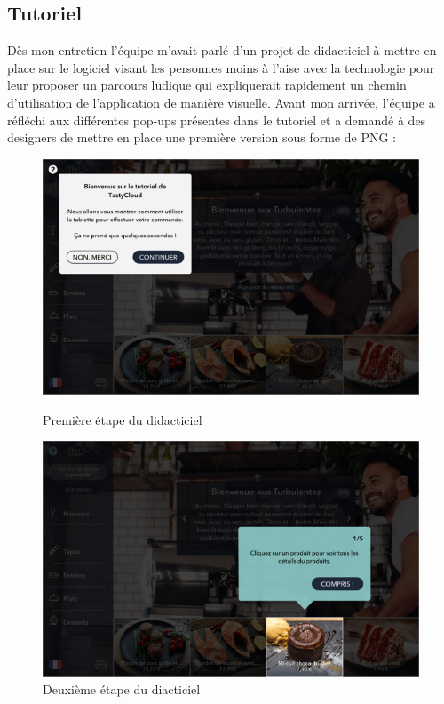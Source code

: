 \clearpage

\subsection{Tutoriel}

Dès mon entretien l'équipe m'avait parlé d'un projet de didacticiel à mettre en place sur le logiciel visant les personnes moins à l'aise avec la technologie pour leur proposer un parcours ludique qui expliquerait rapidement un chemin d'utilisation de l'application de manière visuelle. Avant mon arrivée, l'équipe a réfléchi aux différentes pop-ups présentes dans le tutoriel et a demandé à des designers de mettre en place une première version sous forme de PNG :

\begin{figure}[!htb]
  \centering
  \begin{minipage}[b]{0.45\textwidth}
    \includegraphics[width=\textwidth]{images/tutoriel_design.png}
    \caption{Première étape du didacticiel}
  \end{minipage}
  \hfill
  \begin{minipage}[b]{0.45\textwidth}
    \includegraphics[width=\textwidth]{images/tutoriel_design2.png}
    \caption{Deuxième étape du diacticiel}
  \end{minipage}
\end{figure}

